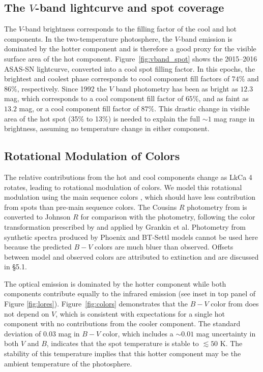 \documentclass[twocolumn]{emulateapj}%
\begin{document}
\subsection{The $V$-band lightcurve and spot coverage}\label{sec:rotSpot1}

The  $V$-band brightness corresponds to the filling factor of the cool and hot components.  In the two-temperature photosphere, the $V$-band emission is dominated by the hotter component and is therefore a good proxy for the visible surface area of the hot component.  Figure~\ref{fig:vband_spot} shows the 2015--2016 ASAS-SN lightcurve, converted into a cool spot filling factor.  In this epochs, the brightest and coolest phase corresponds to cool component fill factors of $74\%$ and $86\%$, respectively.  Since 1992 the $V$ band photometry has been as bright as $12.3$ mag, which corresponds to a cool component fill factor of $65\%$, and as faint as $13.2$ mag, or a cool component fill factor of $87\%$.  This drastic change in visible area of the hot spot (35\% to 13\%) is needed to explain the full $\sim 1$ mag range in brightness, assuming no temperature change in either component.


\subsection{Rotational Modulation of Colors}\label{sec:rotSpot}

The relative contributions from the hot and cool components change as LkCa 4 rotates, leading to rotational modulation of colors.  We model this rotational modulation using the main sequence colors \citep[compiled by][]{pecaut13}, which should have less contribution from spots than  pre-main sequence colors.  The Cousins $R$ photometry from \citet{pecaut13} is converted to Johnson $R$ for comparison with the \citet{grankin08} photometry, following the color transformation prescribed by \citet{landolt82} and applied by Grankin et al.  Photometry from synthetic spectra produced by Phoenix and BT-Settl models cannot be used here because the predicted $B-V$ colors are much bluer than observed.  Offsets between model and observed colors are attributed to extinction and are discussed in \S 5.1.

The optical emission is dominated by the hotter component while both components contribute equally to the infrared emission (see inset in top panel of Figure \ref{fig:lores}).  Figure~\ref{fig:colors} demonstrates that the $B-V$ color from \citet{grankin08} does not depend on $V$, which is consistent with expectations for a single hot component with no contributions from the cooler component.  The standard deviation of 0.03 mag in $B-V$ color, which includes a $\sim 0.01$ mag uncertainty in both $V$ and $B$, indicates that the spot temperature is stable to $\lesssim 50$ K.  The stability of this temperature implies that this hotter component may be the ambient temperature of the photosphere.
\end{document}
